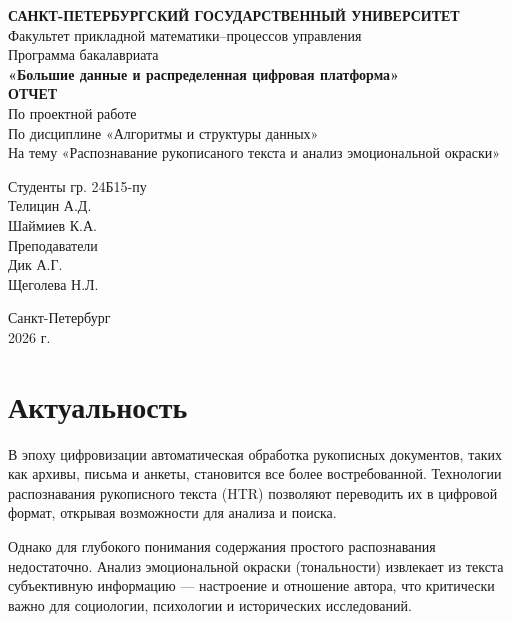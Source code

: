 \documentclass[12pt,a4paper]{article}
\begin{document}
\begin{titlepage}
    \centering
    {\large \textbf{САНКТ-ПЕТЕРБУРГСКИЙ ГОСУДАРСТВЕННЫЙ УНИВЕРСИТЕТ}} \\[0.5cm]
    {\large Факультет прикладной математики--процессов управления} \\[0.5cm]
    {\large Программа бакалавриата} \\[0.2cm]
    {\large \textbf{«Большие данные и распределенная цифровая платформа»}} \\[4.5cm]

    {\Large \textbf{ОТЧЕТ}} \\[0.3cm]
    {\large По проектной работе} \\[0.2cm]
    {\large По дисциплине «Алгоритмы и структуры данных»} \\[0.2cm]
    {\large На тему «Распознавание рукописаного текста и анализ эмоциональной окраски»} \\[4cm]

    \begin{flushright}
        Студенты гр. 24Б15-пу \\ [0.5cm]
        Телицин А.Д. \\
        Шаймиев К.А. \\[1cm]
        Преподаватели \\ [0.5cm]
        Дик А.Г. \\
        Щеголева Н.Л. \\[1cm]
    \end{flushright}

    \vfill
    \centering
    Санкт-Петербург \\
    2026 г.
\end{titlepage}

\tableofcontents
\newpage

\section{Актуальность}
\label{sec:relevance}

В эпоху цифровизации автоматическая обработка рукописных документов, таких как архивы, письма и анкеты, становится все более востребованной. Технологии распознавания рукописного текста (HTR) позволяют переводить их в цифровой формат, открывая возможности для анализа и поиска.

Однако для глубокого понимания содержания простого распознавания недостаточно. Анализ эмоциональной окраски (тональности) извлекает из текста субъективную информацию — настроение и отношение автора, что критически важно для социологии, психологии и исторических исследований.
\end{document}
